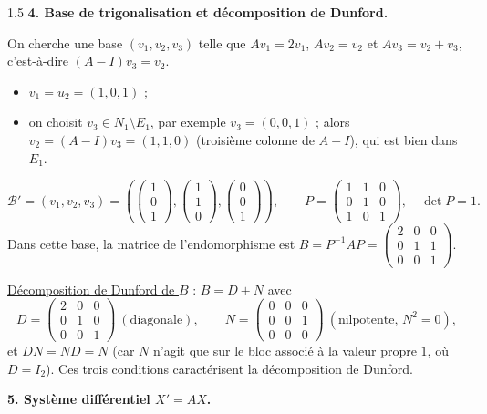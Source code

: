 \documentclass[12pt]{article}
\begin{document}
\begin{spacing}{1.5}
\textbf{4. Base de trigonalisation et décomposition de Dunford.}

On cherche une base $(v_1,v_2,v_3)$ telle que $Av_1=2v_1$, $Av_2=v_2$ et $Av_3=v_2+v_3$, c'est-à-dire $(A-I)v_3=v_2$.
\begin{itemize}
\item $v_1=u_2=(1,0,1)$ ;
\item on choisit $v_3\in N_1\setminus E_1$, par exemple $v_3=(0,0,1)$ ; alors $v_2=(A-I)v_3=(1,1,0)$ (troisième colonne de $A-I$), qui est bien dans $E_1$.
\end{itemize}
\[
\mathcal{B}'=(v_1,v_2,v_3)=\left(\begin{pmatrix}1\\0\\1\end{pmatrix},\begin{pmatrix}1\\1\\0\end{pmatrix},\begin{pmatrix}0\\0\\1\end{pmatrix}\right),\qquad
P=\begin{pmatrix}1&1&0\\0&1&0\\1&0&1\end{pmatrix},\quad\det P=1 .
\]
Dans cette base, la matrice de l'endomorphisme est $B=P^{-1}AP=\begin{pmatrix}2&0&0\\0&1&1\\0&0&1\end{pmatrix}$.

\underline{Décomposition de Dunford de $B$} : $B=D+N$ avec
\[
D=\begin{pmatrix}2&0&0\\0&1&0\\0&0&1\end{pmatrix}\ (\text{diagonale}),\qquad N=\begin{pmatrix}0&0&0\\0&0&1\\0&0&0\end{pmatrix}\ (\text{nilpotente, } N^2=0),
\]
et $DN=ND=N$ (car $N$ n'agit que sur le bloc associé à la valeur propre $1$, où $D=I_2$). Ces trois conditions caractérisent la décomposition de Dunford.

\textbf{5. Système différentiel $X'=AX$.}


\end{spacing}
\end{document}
